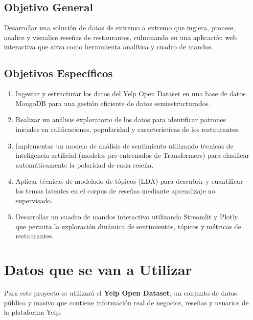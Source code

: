 \documentclass[12pt,a4paper]{article}
\begin{document}
\subsection{Objetivo General}

Desarrollar una solución de datos de extremo a extremo que ingiera, procese, analice y visualice reseñas de restaurantes, culminando en una aplicación web interactiva que sirva como herramienta analítica y cuadro de mandos.

\subsection{Objetivos Específicos}

\begin{enumerate}[label=\arabic*.]
    \item Ingestar y estructurar los datos del Yelp Open Dataset en una base de datos MongoDB para una gestión eficiente de datos semiestructurados.
    
    \item Realizar un análisis exploratorio de los datos para identificar patrones iniciales en calificaciones, popularidad y características de los restaurantes.
    
    \item Implementar un modelo de análisis de sentimiento utilizando técnicas de inteligencia artificial (modelos pre-entrenados de Transformers) para clasificar automáticamente la polaridad de cada reseña.
    
    \item Aplicar técnicas de modelado de tópicos (LDA) para descubrir y cuantificar los temas latentes en el corpus de reseñas mediante aprendizaje no supervisado.
    
    \item Desarrollar un cuadro de mandos interactivo utilizando Streamlit y Plotly que permita la exploración dinámica de sentimientos, tópicos y métricas de restaurantes.
\end{enumerate}

\section{Datos que se van a Utilizar}

Para este proyecto se utilizará el \textbf{Yelp Open Dataset}, un conjunto de datos público y masivo que contiene información real de negocios, reseñas y usuarios de la plataforma Yelp.
\end{document}
